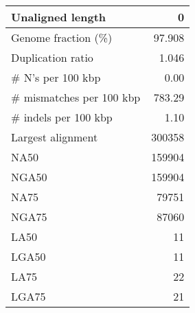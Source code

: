 \documentclass[12pt,a4paper]{article}
\begin{document}
\begin{table}[ht]
\begin{center}
\begin{tabular}{|l*{1}{|r}|}
Unaligned length & 0 \\ \hline
Genome fraction (\%) & 97.908 \\ \hline
Duplication ratio & 1.046 \\ \hline
\# N's per 100 kbp & 0.00 \\ \hline
\# mismatches per 100 kbp & 783.29 \\ \hline
\# indels per 100 kbp & 1.10 \\ \hline
Largest alignment & 300358 \\ \hline
NA50 & 159904 \\ \hline
NGA50 & 159904 \\ \hline
NA75 & 79751 \\ \hline
NGA75 & 87060 \\ \hline
LA50 & 11 \\ \hline
LGA50 & 11 \\ \hline
LA75 & 22 \\ \hline
LGA75 & 21 \\ \hline
\end{tabular}
\end{center}
\end{table}
\end{document}
